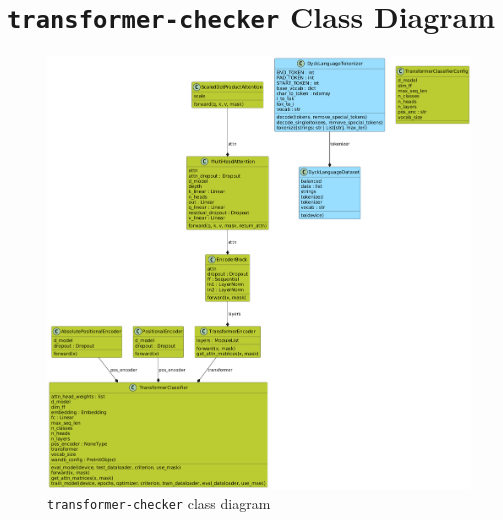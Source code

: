 \section{\texttt{transformer-checker} Class Diagram}\label{annex:class-diag}

\begin{figure}[h]
    \centering
    \includegraphics[width=\linewidth]{docs/figs/class-diagram.png}
    \caption{\texttt{transformer-checker} class diagram}
    \label{fig:class-diagram}
\end{figure}